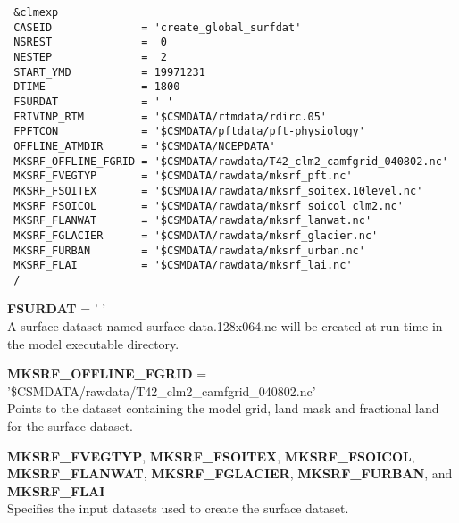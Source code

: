 \begin{verbatim}
 &clmexp 
 CASEID              = 'create_global_surfdat'  
 NSREST              =  0 
 NESTEP              =  2 
 START_YMD           = 19971231 
 DTIME               = 1800 
 FSURDAT             = ' '   
 FRIVINP_RTM         = '$CSMDATA/rtmdata/rdirc.05' 
 FPFTCON             = '$CSMDATA/pftdata/pft-physiology' 
 OFFLINE_ATMDIR      = '$CSMDATA/NCEPDATA' 
 MKSRF_OFFLINE_FGRID = '$CSMDATA/rawdata/T42_clm2_camfgrid_040802.nc' 
 MKSRF_FVEGTYP       = '$CSMDATA/rawdata/mksrf_pft.nc' 
 MKSRF_FSOITEX       = '$CSMDATA/rawdata/mksrf_soitex.10level.nc' 
 MKSRF_FSOICOL       = '$CSMDATA/rawdata/mksrf_soicol_clm2.nc' 
 MKSRF_FLANWAT       = '$CSMDATA/rawdata/mksrf_lanwat.nc' 
 MKSRF_FGLACIER      = '$CSMDATA/rawdata/mksrf_glacier.nc' 
 MKSRF_FURBAN        = '$CSMDATA/rawdata/mksrf_urban.nc' 
 MKSRF_FLAI          = '$CSMDATA/rawdata/mksrf_lai.nc' 
 / 
\end{verbatim}

\medskip \noindent 
{\bf FSURDAT} = ' ' \\ 
A surface dataset named surface-data.128x064.nc will be created at run
time in the model executable directory.

\medskip \noindent 
{\bf MKSRF\_OFFLINE\_FGRID} = '\$CSMDATA/rawdata/T42\_clm2\_camfgrid\_040802.nc'\\ 
Points to the dataset containing the model grid, land mask and
fractional land for the surface dataset.

\medskip \noindent 
{\bf MKSRF\_FVEGTYP}, {\bf MKSRF\_FSOITEX}, {\bf MKSRF\_FSOICOL}, {\bf
MKSRF\_FLANWAT}, {\bf MKSRF\_FGLACIER}, {\bf MKSRF\_FURBAN}, and {\bf
MKSRF\_FLAI} \\ 
Specifies the input datasets used to create the surface dataset.

